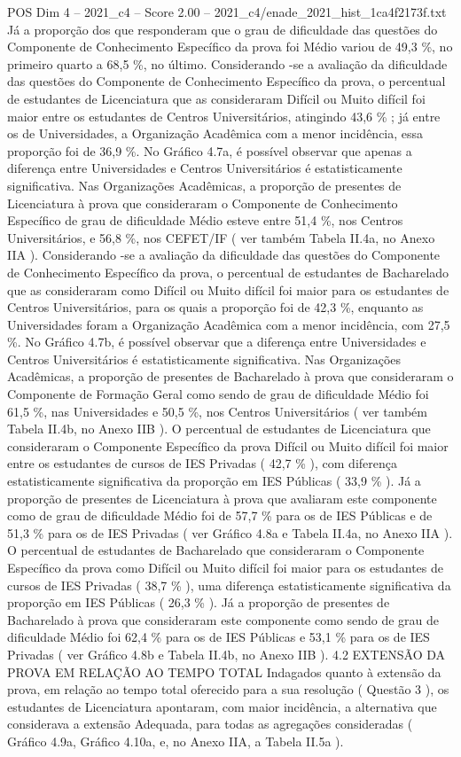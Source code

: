 \begin{textsample}{POS Dim 4 – 2021\_c4 – Score 2.00 – 2021\_c4/enade\_2021\_hist\_1ca4f2173f.txt}
Já a proporção dos que responderam que o grau de dificuldade das questões do Componente de Conhecimento Específico da prova foi Médio variou de 49,3 \%, no primeiro quarto a 68,5 \%, no último.
Considerando -se a avaliação da dificuldade das questões do Componente de Conhecimento Específico da prova, o percentual de estudantes de Licenciatura que as consideraram Difícil ou Muito difícil foi maior entre os estudantes de Centros Universitários, atingindo 43,6 \% ; já entre os de Universidades, a Organização Acadêmica com a menor incidência, essa proporção foi de 36,9 \%.
No Gráfico 4.7a, é possível observar que apenas a diferença entre Universidades e Centros Universitários é estatisticamente significativa.
Nas Organizações Acadêmicas, a proporção de presentes de Licenciatura à prova que consideraram o Componente de Conhecimento Específico de grau de dificuldade Médio esteve entre 51,4 \%, nos Centros Universitários, e 56,8 \%, nos CEFET/IF ( ver também Tabela II.4a, no Anexo IIA ).
Considerando -se a avaliação da dificuldade das questões do Componente de Conhecimento Específico da prova, o percentual de estudantes de Bacharelado que as consideraram como Difícil ou Muito difícil foi maior para os estudantes de Centros Universitários, para os quais a proporção foi de 42,3 \%, enquanto as Universidades foram a Organização Acadêmica com a menor incidência, com 27,5 \%.
No Gráfico 4.7b, é possível observar que a diferença entre Universidades e Centros Universitários é estatisticamente significativa.
Nas Organizações Acadêmicas, a proporção de presentes de Bacharelado à prova que consideraram o Componente de Formação Geral como sendo de grau de dificuldade Médio foi 61,5 \%, nas Universidades e 50,5 \%, nos Centros Universitários ( ver também Tabela II.4b, no Anexo IIB ).
O percentual de estudantes de Licenciatura que consideraram o Componente Específico da prova Difícil ou Muito difícil foi maior entre os estudantes de cursos de IES Privadas ( 42,7 \% ), com diferença estatisticamente significativa da proporção em IES Públicas ( 33,9 \% ).
Já a proporção de presentes de Licenciatura à prova que avaliaram este componente como de grau de dificuldade Médio foi de 57,7 \% para os de IES Públicas e de 51,3 \% para os de IES Privadas ( ver Gráfico 4.8a e Tabela II.4a, no Anexo IIA ).
O percentual de estudantes de Bacharelado que consideraram o Componente Específico da prova como Difícil ou Muito difícil foi maior para os estudantes de cursos de IES Privadas ( 38,7 \% ), uma diferença estatisticamente significativa da proporção em IES Públicas ( 26,3 \% ).
Já a proporção de presentes de Bacharelado à prova que consideraram este componente como sendo de grau de dificuldade Médio foi 62,4 \% para os de IES Públicas e 53,1 \% para os de IES Privadas ( ver Gráfico 4.8b e Tabela II.4b, no Anexo IIB ). 4.2 EXTENSÃO DA PROVA EM RELAÇÃO AO TEMPO TOTAL Indagados quanto à extensão da prova, em relação ao tempo total oferecido para a sua resolução ( Questão 3 ), os estudantes de Licenciatura apontaram, com maior incidência, a alternativa que considerava a extensão Adequada, para todas as agregações consideradas ( Gráfico 4.9a, Gráfico 4.10a, e, no Anexo IIA, a Tabela II.5a ).

\end{textsample}
